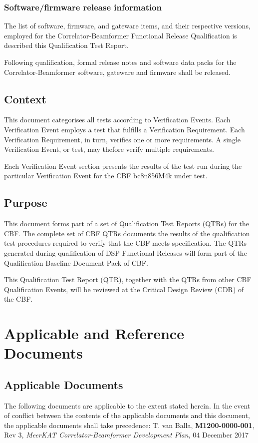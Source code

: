 \subsection{Software/firmware release information}
The list of software, firmware, and gateware items, and their respective versions, employed for the Correlator-Beamformer Functional Release Qualification is described this Qualification Test Report.

Following qualification, formal release notes and software data packs for the Correlator-Beamformer software, gateware and firmware shall be released.
\section{Context}
This document categorises all tests according to Verification Events. Each Verification Event employs a test that fulfills a Verification Requirement. Each Verification Requirement, in turn, verifies one or more requirements. A single Verification Event, or test, may thefore verify multiple requirements.

Each Verification Event section presents the results of the test run during the particular Verification Event for the CBF bc8n856M4k under test.
\section{Purpose}
This document forms part of a set of Qualification Test Reports (QTRs) for the CBF. The complete set of CBF QTRs documents the results of the qualification test procedures required to verify that the CBF meets specification. The QTRs generated during qualification of DSP Functional Releases will form part of the Qualification Baseline Document Pack of CBF.\newline

This Qualification Test Report (QTR), together with the QTRs from other CBF Qualification Events, will be reviewed at the Critical Design Review (CDR) of the CBF.
\chapter{Applicable and Reference Documents}
\section{Applicable Documents}
The following documents are applicable to the extent stated herein. In the event of conflict between the contents of the applicable documents and this document, the applicable documents shall take precedence:\newline\newline
[1]\hspace{10mm} T. van Balla, {\bf M1200-0000-001}, Rev 3, {\it MeerKAT Correlator-Beamformer Development Plan}, 04 December 2017\newline\
